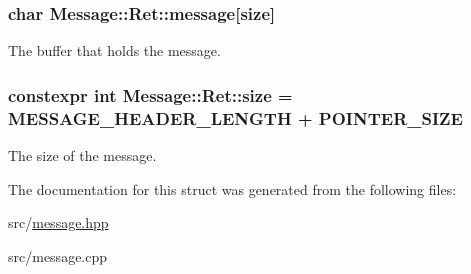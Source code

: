 \subsubsection[{\texorpdfstring{message}{message}}]{\setlength{\rightskip}{0pt plus 5cm}char Message\+::\+Ret\+::message\mbox{[}{\bf size}\mbox{]}}\hypertarget{struct_message_1_1_ret_ad2ec4cd89746f6199effe93fffa1d5fc}{}\label{struct_message_1_1_ret_ad2ec4cd89746f6199effe93fffa1d5fc}


The buffer that holds the message. 

\subsubsection[{\texorpdfstring{size}{size}}]{\setlength{\rightskip}{0pt plus 5cm}constexpr int Message\+::\+Ret\+::size = {\bf M\+E\+S\+S\+A\+G\+E\+\_\+\+H\+E\+A\+D\+E\+R\+\_\+\+L\+E\+N\+G\+TH} + {\bf P\+O\+I\+N\+T\+E\+R\+\_\+\+S\+I\+ZE}\hspace{0.3cm}{\ttfamily [static]}}\hypertarget{struct_message_1_1_ret_a4252f158b2b8db8901e796e51d4a99c9}{}\label{struct_message_1_1_ret_a4252f158b2b8db8901e796e51d4a99c9}


The size of the message. 



The documentation for this struct was generated from the following files\+:\begin{DoxyCompactItemize}
\item 
src/\hyperlink{message_8hpp}{message.\+hpp}\item 
src/message.\+cpp\end{DoxyCompactItemize}
